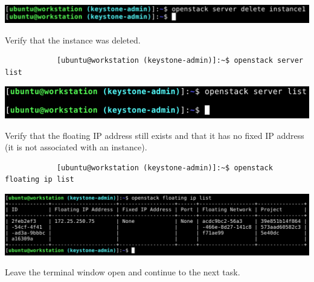 \documentclass[letterpaper, 12pt]{article}
\begin{document}
\begin{enumerate}
\begin{labstep}
        \begin{center}
            \includegraphics[width=\linewidth]{images/part3/step25.png}
        \end{center}
    \end{labstep}

    \begin{labstep}
        Verify that the instance was deleted.
        \begin{lstlisting}
            [ubuntu@workstation (keystone-admin)]:~$ openstack server list
        \end{lstlisting}

        \begin{center}
            \includegraphics[width=\linewidth]{images/part3/step26.png}
        \end{center}
    \end{labstep}

    \begin{labstep}
        Verify that the floating IP address still exists and that it has no fixed IP address (it is not associated with an instance).
        \begin{lstlisting}
            [ubuntu@workstation (keystone-admin)]:~$ openstack floating ip list
        \end{lstlisting}

        \begin{center}
            \includegraphics[width=\linewidth]{images/part3/step27.png}
        \end{center}
    \end{labstep}

    \begin{labstep}
        Leave the terminal window open and continue to the next task.
    \end{labstep}

\end{enumerate}
\end{document}

